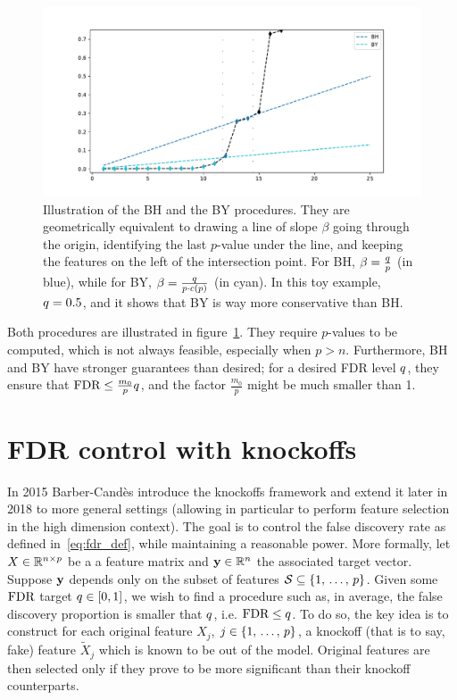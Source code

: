 \begin{figure}[h]
    \centering
    \includegraphics[width=1.\textwidth]{figures/bhy.pdf}
    \caption{
    Illustration of the BH and the BY procedures.
    They are geometrically equivalent to drawing a line of slope $\beta$ going through the origin,
    identifying the last $p$-value under the line, and keeping the features on the left of the intersection point.
    For BH, $\beta = \frac{q}{p}$ (in blue),
    while for BY, $\beta = \frac{q}{p \cdot c(p)}$ (in cyan).
    In this toy example, $q = 0.5$, and it shows that BY is way more conservative than BH.
    }
    \label{fig:bhy}
\end{figure}
\bigbreak
Both procedures are illustrated in figure~\ref{fig:bhy}.
They require $p$-values to be computed, which is not always feasible, especially when $p > n$.
Furthermore, BH and BY have stronger guarantees than desired;
for a desired FDR level $q$,
they ensure that $\text{FDR} \leq \frac{m_0}{p}q$,
and the factor $\frac{m_0}{p}$ might be much smaller than 1.


\FloatBarrier
\section{FDR control with knockoffs}\label{sec:knockoffs}

In 2015 Barber-Candès introduce the knockoffs framework and extend it later in 2018 to more general settings
(allowing in particular to perform feature selection in the high dimension context).
The goal is to control the false discovery rate as defined in~\ref{eq:fdr_def}, while maintaining a reasonable power.
More formally, let $X \in \mathbb{R}^{n \times p}$ be a a feature matrix and $\mathbf{y} \in \mathbb{R}^n$ the associated target vector.
Suppose $\mathbf{y}$ depends only on the subset of features $\mathcal{S} \subseteq \left\{ 1,\, \dots,\, p \right\}$.
Given some $\text{FDR}$ target $q \in [0, 1]$, we wish to find a procedure such as, in average,
the false discovery proportion is smaller that $q$, i.e. $\text{FDR} \leq q$.
To do so, the key idea is to construct for each original feature $X_j$, $j \in \left\{ 1,\, \dots,\, p \right\}$,
a knockoff (that is to say, fake) feature $\tilde{X}_j$ which is known to be out of the model.
Original features are then selected only if they prove to be more significant than their knockoff counterparts.

